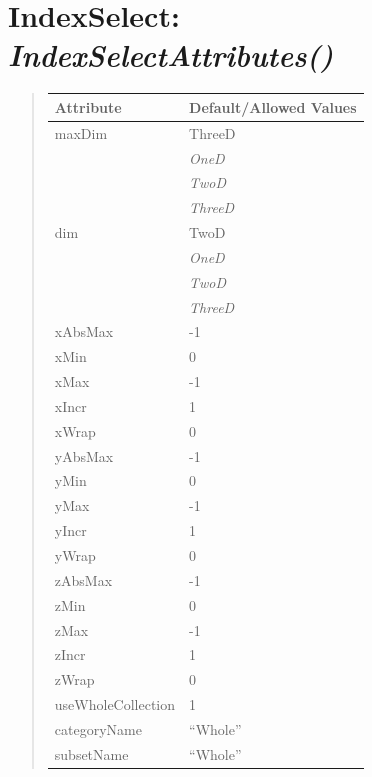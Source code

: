 \documentclass[letterpaper,10pt,english]{sphinxmanual}
\begin{document}
\section{\textbf{IndexSelect}: \emph{IndexSelectAttributes()}}
\label{attributes:indexselect-indexselectattributes}
\begin{DUlineblock}{0em}
\item[] 
\end{DUlineblock}
\begin{quote}

\begin{tabulary}{\linewidth}{|L|L|}
\hline

\textbf{Attribute}
 & 
\textbf{Default/Allowed Values}
\\
\hline
maxDim
 & 
ThreeD
\\
\hline & 
\emph{OneD}
\\
\hline & 
\emph{TwoD}
\\
\hline & 
\emph{ThreeD}
\\
\hline
dim
 & 
TwoD
\\
\hline & 
\emph{OneD}
\\
\hline & 
\emph{TwoD}
\\
\hline & 
\emph{ThreeD}
\\
\hline
xAbsMax
 & 
-1
\\
\hline
xMin
 & 
0
\\
\hline
xMax
 & 
-1
\\
\hline
xIncr
 & 
1
\\
\hline
xWrap
 & 
0
\\
\hline
yAbsMax
 & 
-1
\\
\hline
yMin
 & 
0
\\
\hline
yMax
 & 
-1
\\
\hline
yIncr
 & 
1
\\
\hline
yWrap
 & 
0
\\
\hline
zAbsMax
 & 
-1
\\
\hline
zMin
 & 
0
\\
\hline
zMax
 & 
-1
\\
\hline
zIncr
 & 
1
\\
\hline
zWrap
 & 
0
\\
\hline
useWholeCollection
 & 
1
\\
\hline
categoryName
 & 
``Whole''
\\
\hline
subsetName
 & 
``Whole''
\\
\hline\end{tabulary}

\end{quote}
\end{document}
